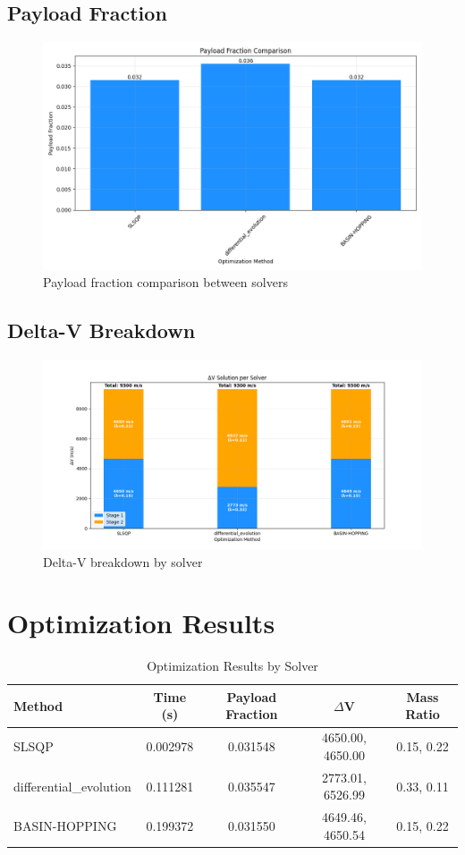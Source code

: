 \documentclass{article}
\begin{document}
\subsection{Payload Fraction}
\begin{figure}[H]
\centering
\includegraphics[width=\textwidth]{payload_fraction.png}
\caption{Payload fraction comparison between solvers}
\end{figure}

\subsection{Delta-V Breakdown}
\begin{figure}[H]
\centering
\includegraphics[width=\textwidth]{dv_breakdown.png}
\caption{Delta-V breakdown by solver}
\end{figure}

\section{Optimization Results}
\begin{table}[H]
\centering
\caption{Optimization Results by Solver}
\small
\begin{tabular}{lcccc}
\toprule
Method & Time (s) & Payload Fraction & $\Delta$V & Mass Ratio \\
\midrule
SLSQP & 0.002978 & 0.031548 & 4650.00, 4650.00 & 0.15, 0.22 \\
differential_evolution & 0.111281 & 0.035547 & 2773.01, 6526.99 & 0.33, 0.11 \\
BASIN-HOPPING & 0.199372 & 0.031550 & 4649.46, 4650.54 & 0.15, 0.22 \\
\bottomrule
\end{tabular}
\end{table}
\end{document}
